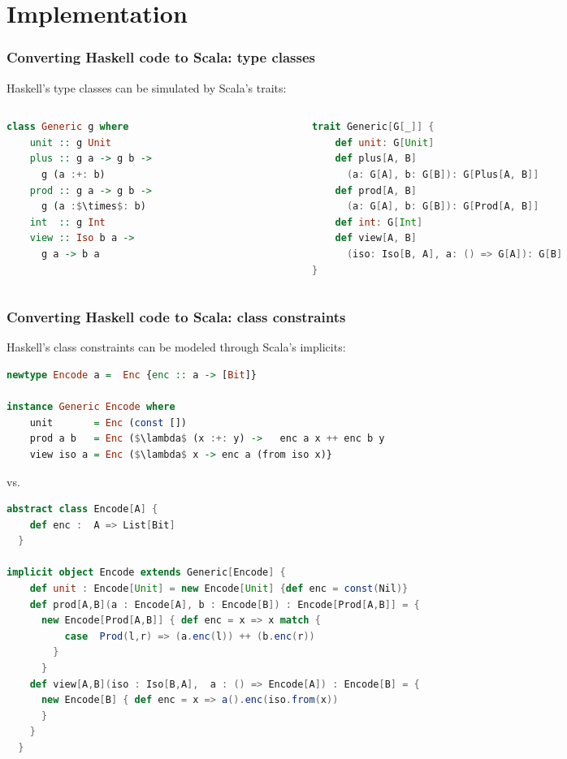 \documentclass[10pt]{beamer}
\begin{document}
\section{Implementation}
\begin{frame}[fragile]
\frametitle{Converting Haskell code to Scala: type classes}
Haskell's type classes can be simulated by Scala's traits:

\begin{columns}
\begin{column}{.35\textwidth}
\begin{lstlisting}[language=Haskell,basicstyle=\ttfamily\scriptsize,mathescape]
class Generic g where
    unit :: g Unit
    plus :: g a -> g b ->
      g (a :+: b)
    prod :: g a -> g b ->
      g (a :$\times$: b)
    int  :: g Int
    view :: Iso b a ->
      g a -> b a
\end{lstlisting}
\end{column}
\begin{column}{.60\textwidth}
\begin{lstlisting}[language=Scala,basicstyle=\ttfamily\scriptsize,mathescape]
trait Generic[G[_]] {
    def unit: G[Unit]
    def plus[A, B]
      (a: G[A], b: G[B]): G[Plus[A, B]]
    def prod[A, B]
      (a: G[A], b: G[B]): G[Prod[A, B]]
    def int: G[Int]
    def view[A, B]
      (iso: Iso[B, A], a: () => G[A]): G[B]
}
\end{lstlisting}
\end{column}
\end{columns}
\end{frame}

\begin{frame}[fragile]
\frametitle{Converting Haskell code to Scala: class constraints}
Haskell's class constraints can be modeled through Scala's implicits:

\begin{lstlisting}[language=Haskell,basicstyle=\ttfamily\scriptsize,mathescape]
newtype Encode a =  Enc {enc :: a -> [Bit]}

instance Generic Encode where
    unit       = Enc (const [])
    prod a b   = Enc ($\lambda$ (x :+: y) ->   enc a x ++ enc b y
    view iso a = Enc ($\lambda$ x -> enc a (from iso x)}
\end{lstlisting}
\vspace{-10pt}vs.
\begin{lstlisting}[language=Scala,basicstyle=\ttfamily\scriptsize,mathescape]
abstract class Encode[A] {
    def enc :  A => List[Bit]
  }

implicit object Encode extends Generic[Encode] {
    def unit : Encode[Unit] = new Encode[Unit] {def enc = const(Nil)}
    def prod[A,B](a : Encode[A], b : Encode[B]) : Encode[Prod[A,B]] = {
      new Encode[Prod[A,B]] { def enc = x => x match {
          case  Prod(l,r) => (a.enc(l)) ++ (b.enc(r))
        }
      }
    def view[A,B](iso : Iso[B,A],  a : () => Encode[A]) : Encode[B] = {
      new Encode[B] { def enc = x => a().enc(iso.from(x))
      }
    }
  }

\end{lstlisting}
\end{frame}
\end{document}
